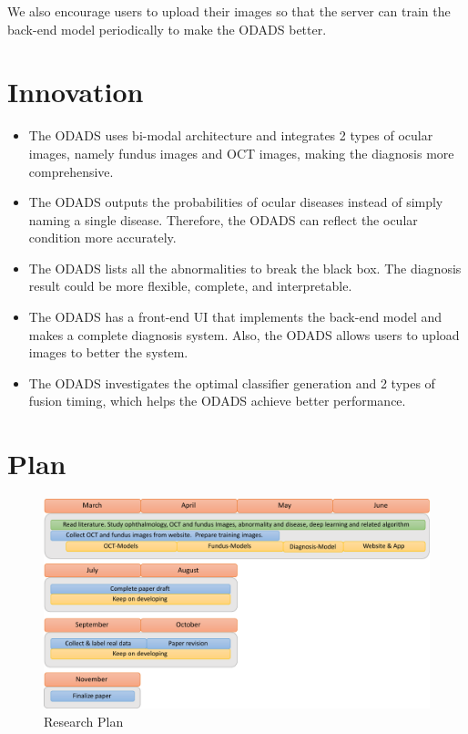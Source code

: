 \documentclass{article}
\begin{document}
	We also encourage users to upload their images so that the server can train the back-end model periodically to make the ODADS better.
	
	\section{Innovation}
		
		\begin{itemize}
			\item The ODADS uses bi-modal architecture and integrates 2 types of ocular images, namely fundus images and OCT images, making the diagnosis more comprehensive. 
			
			\vspace{-0.2cm} 
			\item The ODADS outputs the probabilities of ocular diseases instead of simply naming a single disease. Therefore, the ODADS can reflect the ocular condition more accurately.

			\vspace{-0.2cm} 
			\item The ODADS lists all the abnormalities to break the black box. The diagnosis result could be more flexible, complete, and interpretable.
			
			\vspace{-0.2cm} 
			\item The ODADS has a front-end UI that implements the back-end model and makes a complete diagnosis system. Also, the ODADS allows users to upload images to better the system.

			\vspace{-0.2cm} 
			\item The ODADS investigates the optimal classifier generation and 2 types of fusion timing, which helps the ODADS achieve better performance.

		\end{itemize}
		
	\section{Plan}
		
		\begin{figure}[htbp]
			\centering
			\includegraphics[width=\linewidth]{Plan.pdf}
			\caption{Research Plan}
			\label{fig:plan}
		\end{figure}
		
\end{document}
